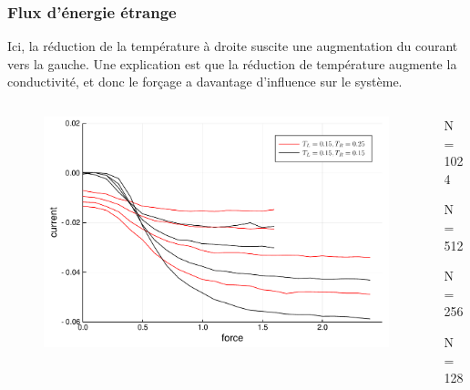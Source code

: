 \begin{frame}

    \frametitle{Flux d'énergie étrange}

    Ici, la réduction de la température à droite suscite une
    \alert{augmentation} du courant vers la gauche. Une explication est
    que la réduction de température augmente la conductivité, et donc
    le forçage a davantage d'influence sur le système.

    \begin{columns}

        \begin{column}{0.8\textwidth}
            \begin{figure}
                \includegraphics[scale=0.4]{plots/energy_current_strange.pdf}
            \end{figure}
        \end{column}

        \begin{column}{0.2\textwidth}

            \scriptsize

            \vspace{15.0mm}
            N = 1024

            \vspace{3.0mm}
            N = 512

            \vspace{4.0mm}
            N = 256

            \vspace{5.0mm}
            N = 128

        \end{column}

    \end{columns}

\end{frame}
